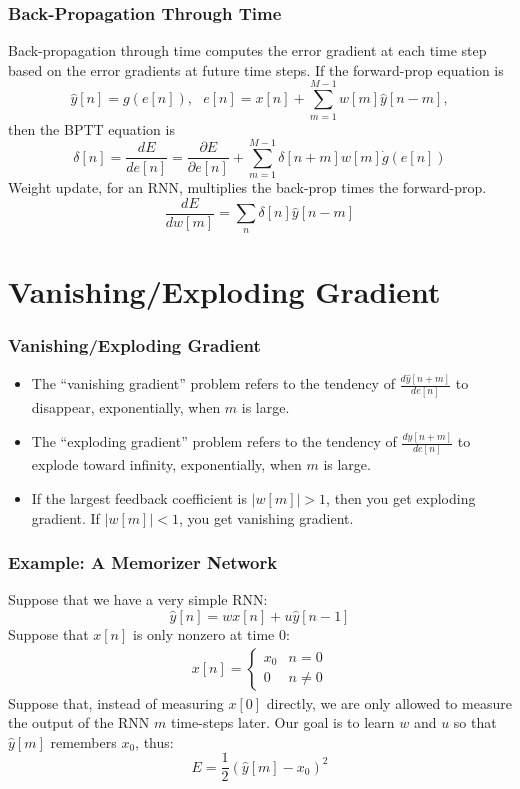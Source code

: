 \documentclass{beamer}
\begin{document}
\begin{frame}
  \frametitle{Back-Propagation Through Time}
  Back-propagation through time computes the error gradient at
  each time step based on the error gradients at future time steps.
  If the forward-prop equation is
  \begin{displaymath}
    \hat{y}[n]=g(e[n]),~~~e[n]=x[n]+\sum_{m=1}^{M-1} w[m]\hat{y}[n-m],
  \end{displaymath}
  then the BPTT equation is
  \begin{displaymath}
    \delta[n]=\frac{dE}{de[n]}=\frac{\partial E}{\partial e[n]}+
    \sum_{m=1}^{M-1}\delta[n+m]w[m]\dot{g}(e[n])
  \end{displaymath}
  Weight update, for an RNN, multiplies the back-prop times the
  forward-prop.
  \[
  \frac{dE}{dw[m]} = \sum_n \delta[n] \hat{y}[n-m]
  \]
\end{frame}


\section[Vanishing Gradient]{Vanishing/Exploding Gradient}
\setcounter{subsection}{1}

\begin{frame}
  \frametitle{Vanishing/Exploding Gradient}
  \begin{itemize}
    \item The ``vanishing gradient'' problem refers to the tendency of
      $\frac{d\hat{y}[n+m]}{de[n]}$ to disappear,
      exponentially, when $m$ is large.
  \item
    The ``exploding gradient'' problem refers to the tendency of
    $\frac{d\hat{y}[n+m]}{de[n]}$ to explode toward infinity,
    exponentially, when $m$ is large.
  \item
    If the largest feedback coefficient is $|w[m]|>1$, then you get
    exploding gradient.  If $|w[m]|<1$, you get vanishing gradient.
    \end{itemize}
\end{frame}

\begin{frame}
  \frametitle{Example: A Memorizer Network}
  Suppose that we have a very simple RNN:
  \[
  \hat{y}[n] = w x[n]+u\hat{y}[n-1]
  \]
  Suppose that $x[n]$ is only nonzero at time $0$:
  \begin{align*}
    x[n]=\begin{cases}x_0&n=0\\0& n\ne 0\end{cases}
  \end{align*}
  Suppose that, instead of measuring $x[0]$ directly, we are only
  allowed to measure the output of the RNN $m$ time-steps later.  Our goal is
  to learn $w$ and $u$ so that $\hat{y}[m]$ remembers $x_0$, thus:
  \[
  E=\frac{1}{2}\left(\hat{y}[m]-x_0\right)^2
  \]
\end{frame}
\end{document}
